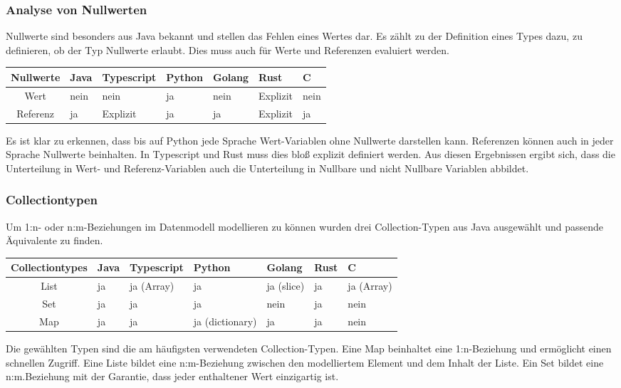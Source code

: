 \documentclass[./einleitung.tex]{subfiles}
\begin{document}
\subsubsection{Analyse von Nullwerten}
Nullwerte sind besonders aus Java bekannt und stellen das Fehlen eines Wertes dar. Es zählt zu der Definition eines Types dazu, zu definieren, ob der Typ Nullwerte erlaubt.
Dies muss auch für Werte und Referenzen evaluiert werden.
\begin{center}
\begin{tabular}{| c || m{4em} | m{5em} | m{5em} | m{4.5em} | m{4.5em} | m{4.5em} |}
\hline
Nullwerte & Java & Typescript & Python & Golang & Rust & C \\
\hline
Wert & nein & nein & ja & nein & Explizit & nein \\
\hline
Referenz & ja & Explizit & ja & ja & Explizit & ja \\
\hline
\end{tabular}
\end{center}
Es ist klar zu erkennen, dass bis auf Python jede Sprache Wert-Variablen ohne Nullwerte darstellen kann.
Referenzen können auch in jeder Sprache Nullwerte beinhalten. In Typescript und Rust muss dies bloß explizit definiert werden.
Aus diesen Ergebnissen ergibt sich, dass die Unterteilung in Wert- und Referenz-Variablen auch die Unterteilung in Nullbare und nicht Nullbare Variablen abbildet.

\subsubsection{Collectiontypen}
Um 1:n- oder n:m-Beziehungen im Datenmodell modellieren zu können wurden drei Collection-Typen aus Java ausgewählt und passende Äquivalente zu finden.
\begin{center}
\begin{tabular}{| c || m{3em} | m{4.5em} | m{5.5em} | m{4.5em} | m{3em} | m{4.5em} |}
\hline
Collectiontypes & Java & Typescript & Python & Golang & Rust & C \\
\hline
List & ja & ja (Array) & ja & ja (slice) & ja & ja (Array) \\
\hline
Set & ja & ja & ja & nein & ja & nein \\
\hline
Map & ja & ja & ja (dictionary)& ja & ja & nein \\
\hline

\end{tabular}
\end{center}
Die gewählten Typen sind die am häufigsten verwendeten Collection-Typen. 
Eine Map beinhaltet eine 1:n-Beziehung und ermöglicht einen schnellen Zugriff.
Eine Liste bildet eine n:m-Beziehung zwischen den modelliertem Element und dem Inhalt der Liste.
Ein Set bildet eine n:m.Beziehung mit der Garantie, dass jeder enthaltener Wert einzigartig ist. \\
\end{document}

